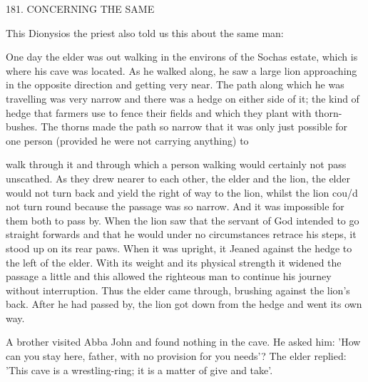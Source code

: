 181. CONCERNING THE SAME

This Dionysios the priest also told us this about the same man:

One day the elder was out walking in the environs of the Sochas
estate, which is where his cave was located. As he walked along, he
saw a large lion approaching in the opposite direction and getting
very near. The path along which he was travelling was very narrow
and there was a hedge on either side of it; the kind of hedge that
farmers use to fence their fields and which they plant with thorn-
bushes. The thorns made the path so narrow that it was only just
possible for one person (provided he were not carrying anything) to

walk through it and through which a person walking would
certainly not pass unscathed. As they drew nearer to each other, the
elder and the lion, the elder would not turn back and yield the right
of way to the lion, whilst the lion cou/d not turn round because the
passage was so narrow. And it was impossible for them both to pass
by. When the lion saw that the servant of God intended to go
straight forwards and that he would under no circumstances retrace
his steps, it stood up on its rear paws. When it was upright, it
Jeaned against the hedge to the left of the elder. With its weight and
its physical strength it widened the passage a little and this allowed
the righteous man to continue his journey without interruption.
Thus the elder came through, brushing against the lion's back. After
he had passed by, the lion got down from the hedge and went its
own way.

A brother visited Abba John and found nothing in the cave. He
asked him: 'How can you stay here, father, with no provision for
you needs'? The elder replied: 'This cave is a wrestling-ring; it is a
matter of give and take'.

